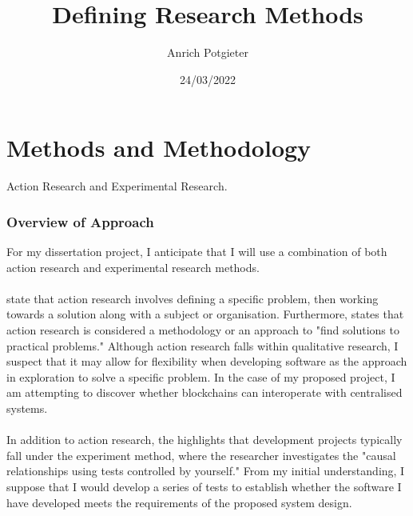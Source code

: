 \documentclass[12pt]{article}
\title{Defining Research Methods}
\author{Anrich Potgieter}
\date{24/03/2022}
\begin{document}
\maketitle
\tableofcontents

\section{Methods and Methodology}

Action Research and Experimental Research.

\subsubsection{Overview of Approach}

For my dissertation project, I anticipate that I will use a combination of both action research and experimental research methods.
\\\\
\autocite{dawsonChapterResearchMethods2015} state that action research involves defining a specific problem, then working towards a solution along with a subject or organisation.
Furthermore, \autocite{blairChapterChoosingMethodology2016} states that action research is considered a methodology or an approach to "find solutions to practical problems." 
Although action research falls within qualitative research, I suspect that it may allow for flexibility when developing software as the approach in exploration to solve a specific problem. In the case of my proposed project, I am attempting to discover whether blockchains can interoperate with centralised systems.
\\\\
In addition to action research, the \autocite{dawsonChapterResearchMethods2015} highlights that development projects typically fall under the experiment method, where the researcher investigates the "causal relationships using tests controlled by yourself."
From my initial understanding, I suppose that I would develop a series of tests to establish whether the software I have developed meets the requirements of the proposed system design.

\printbibliography
\end{document}
